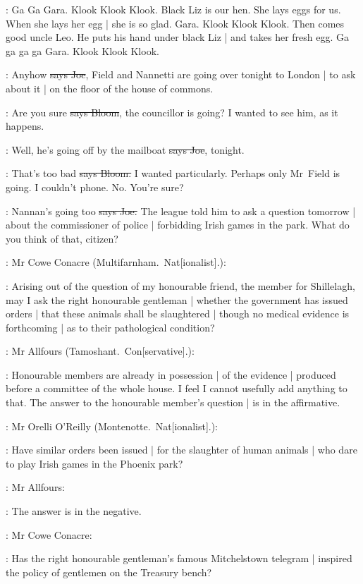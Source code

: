:
Ga Ga Gara.
Klook Klook Klook.
Black Liz is our hen.
She lays eggs for us.
When she lays her egg |
she is so glad.
Gara.
Klook Klook Klook.
Then comes good uncle Leo.
He puts his hand under black Liz |
and takes her fresh egg.
Ga ga ga ga Gara.
Klook Klook Klook.

\joe:
Anyhow
\sout{says Joe},
Field and Nannetti are going over tonight to London
 |
to ask about it |
on the floor of the house of commons.

\Bloom:
Are you sure
\sout{says Bloom},
the councillor is going?
I wanted to see him,
as it happens.

\joe:
Well,
he's going off by the mailboat
\sout{says Joe},
tonight.

\Bloom:
That's too bad
\sout{says Bloom.}
I wanted particularly.
Perhaps only Mr~Field is going.
I couldn't phone.
No.
You're sure?

\joe:
Nannan's going too
\sout{says Joe.}
The league told him to ask a question tomorrow |
about the commissioner of police |
forbidding Irish games in the park.
What do you think of that,
citizen?

:
Mr Cowe Conacre
(Multifarnham.~Nat[ionalist].):

\conacre:
Arising out of the question of my honourable friend,
the member for Shillelagh,
may I ask the right honourable gentleman |
whether the government has issued orders |
that these animals shall be slaughtered |
though no medical evidence is forthcoming |
as to their pathological condition?

:
Mr Allfours
(Tamoshant.~Con[servative].):

\allfours:
Honourable members are already in possession |
of the evidence |
produced before a committee of the whole house.
I feel I cannot usefully add anything to that.
The answer to the honourable member's question |
is in the affirmative.

:
Mr Orelli O'Reilly
(Montenotte.~Nat[ionalist].):


\oreilly:
Have similar orders been issued |
for the slaughter of human animals
 |
who dare to play Irish games in the Phoenix park?

:
Mr Allfours:

\allfours:
The answer is in the negative.

:
Mr Cowe Conacre:

\conacre:
Has the right honourable gentleman's famous Mitchelstown telegram |
inspired the policy of gentlemen on the Treasury bench?

